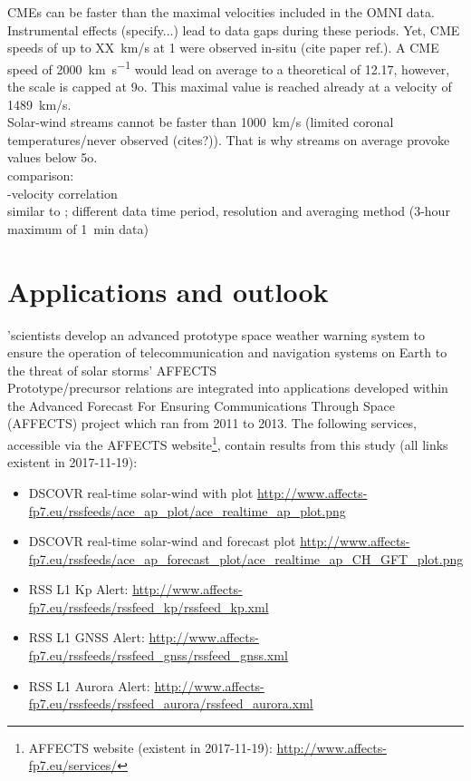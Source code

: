 CMEs can be faster than the maximal velocities included in the OMNI data. Instrumental effects (specify...) lead to data gaps during these periods. Yet, CME speeds of up to XX~km/s at \SI{1}{\au} were observed in-situ (cite paper ref.). A CME speed of \SI{2000}{\km\per\s} would lead on average to a theoretical \Kp{} of 12.17, however, the \Kp{} scale is capped at 9o. This maximal value is reached already at a velocity of 1489~km/s.\\

Solar-wind streams cannot be faster than 1000~km/s (limited coronal temperatures/never observed (cites?)). That is why streams on average provoke \Kp{} values below 5o.\\

comparison:\\
\Kp-velocity correlation\\
similar to \citet{Elliott2013}; different data time period, resolution and averaging method (3-hour maximum of 1~min data)\\


\section{Applications and outlook}

'scientists develop an advanced prototype space weather warning system to ensure the operation of telecommunication and navigation systems on Earth to the threat of solar storms' AFFECTS\\

Prototype/precursor relations are integrated into applications developed within the Advanced Forecast For Ensuring Communications Through Space (\mbox{AFFECTS}) project which ran from 2011 to 2013. The following services, accessible via the \mbox{AFFECTS} website\footnote{AFFECTS website (existent in 2017-11-19): \url{http://www.affects-fp7.eu/services/}}, contain results from this \Kp{} study (all links existent in 2017-11-19):
\begin{itemize}
	\item DSCOVR real-time solar-wind with \Kp{} plot \url{http://www.affects-fp7.eu/rssfeeds/ace_ap_plot/ace_realtime_ap_plot.png}
	\item DSCOVR real-time solar-wind and \Kp{} forecast plot \url{http://www.affects-fp7.eu/rssfeeds/ace_ap_forecast_plot/ace_realtime_ap_CH_GFT_plot.png}
	\item RSS L1 Kp Alert: \url{http://www.affects-fp7.eu/rssfeeds/rssfeed_kp/rssfeed_kp.xml}
	\item RSS L1 GNSS Alert: \url{http://www.affects-fp7.eu/rssfeeds/rssfeed_gnss/rssfeed_gnss.xml}
	\item RSS L1 Aurora Alert: \url{http://www.affects-fp7.eu/rssfeeds/rssfeed_aurora/rssfeed_aurora.xml}
\end{itemize}


